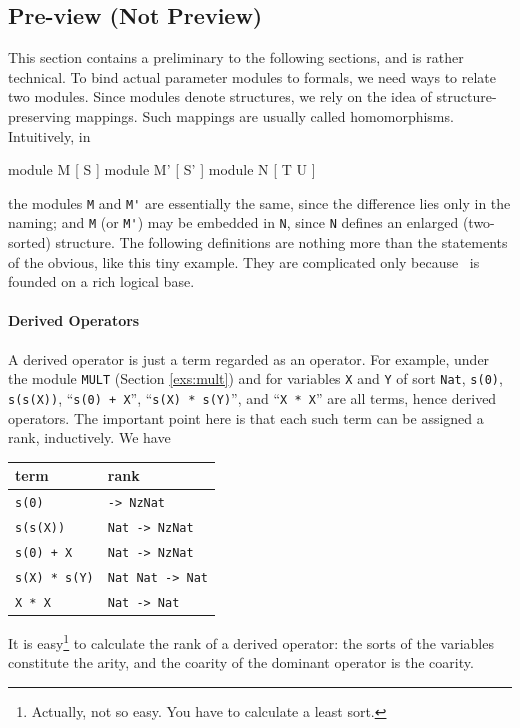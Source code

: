\documentclass[a4paper]{memoir}
\begin{document}
\subsection{Pre-view (Not Preview)}\label{sec:p2-pre-view}

This section contains a preliminary to the following sections,
and is rather technical. To bind actual parameter modules to formals,
we need ways to relate two modules. Since modules denote structures,
we rely on the idea of structure-preserving mappings. Such mappings
are usually called homomorphisms.
Intuitively, in
\begin{vvtm}
\begin{ccode}
  module M { [ S ] }
  module M' { [ S' ] }
  module N { [ T U ] }
\end{ccode}
\end{vvtm}
the modules \verb|M| and \verb|M'| are essentially the same, since
the difference lies only in the naming; and \verb|M| (or \verb|M'|)
may be embedded in \verb|N|, since \verb|N| defines an enlarged
(two-sorted) structure. The following definitions are nothing more
than the statements of the obvious, like this tiny example. They
are complicated only because \cafeobj~is founded on a rich logical base.

\paragraph{Derived Operators}

A derived operator is just a term regarded as an operator.
For example, under the module \verb|MULT| (Section \ref{exs:mult})
and for variables \verb|X| and \verb|Y| of sort \verb|Nat|,
\verb|s(0)|, \verb|s(s(X))|, ``\verb|s(0) + X|'', ``\verb|s(X) * s(Y)|'', and
``\verb|X * X|'' are all
terms, hence derived operators. The important point here is that each
such term can be assigned a rank, inductively. We have
\begin{center}
\begin{tabular}{ll}
\multicolumn{1}{l}{term} & \multicolumn{1}{l}{rank} \\ \hline
\verb|s(0)| & \verb|-> NzNat| \\
\verb|s(s(X))| & \verb|Nat -> NzNat| \\
\verb|s(0) + X| & \verb|Nat -> NzNat| \\
\verb|s(X) * s(Y)| & \verb|Nat Nat -> Nat| \\
\verb|X * X| & \verb|Nat -> Nat| \\
\end{tabular}
\end{center}
It is easy\footnote{
Actually, not so easy. You have to calculate a least sort.
}
to calculate the rank of a derived operator: the sorts of
the variables constitute the arity, and the coarity of the dominant operator
is the coarity.
\end{document}
